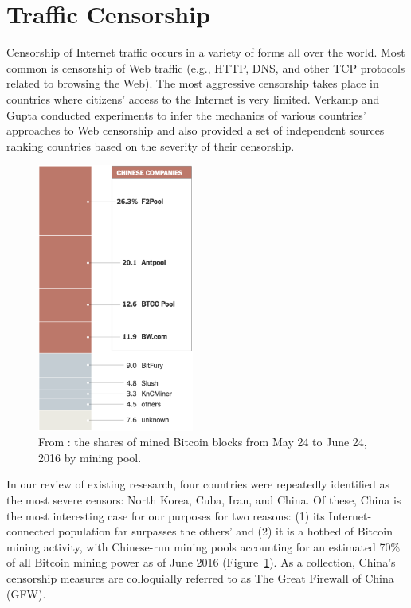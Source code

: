 \section{Traffic Censorship}
Censorship of Internet traffic occurs in a variety of forms all over the world. Most common is censorship of Web traffic (e.g., HTTP, DNS, and other TCP protocols related to browsing the Web). The most aggressive censorship takes place in countries where citizens' access to the Internet is very limited. Verkamp and Gupta \cite{Verkamp2012} conducted experiments to infer the mechanics of various countries' approaches to Web censorship and also provided a set of independent sources ranking countries based on the severity of their censorship. 

\begin{figure}[h]
\centering
\includegraphics[height=250pt]{Images/NYT-Bitcoin-China.png}
\caption{From \cite{Popper2016}: the shares of mined Bitcoin blocks from May 24 to June 24, 2016 by mining pool.}
\label{fig:BTCPools}
\end{figure}

In our review of existing resesarch, four countries were repeatedly identified as the most severe censors: North Korea, Cuba, Iran, and China. Of these, China is the most interesting case for our purposes for two reasons: (1) its Internet-connected population far surpasses the others' and (2) it is a hotbed of Bitcoin mining activity, with Chinese-run mining pools accounting for an estimated 70\% of all Bitcoin mining power as of June 2016 (Figure~\ref{fig:BTCPools}). As a collection, China's censorship measures are colloquially referred to as The Great Firewall of China (GFW).
